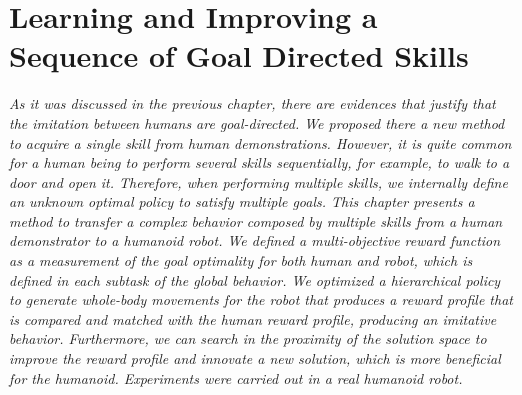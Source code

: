 \chapter{Learning and Improving a Sequence of Goal Directed Skills}\label{ch_multiple_behaviors}
\textit{As it was discussed in the previous chapter, there are evidences that justify that the imitation between humans are goal-directed. We proposed there a new method to acquire a single skill from human demonstrations. However, it is quite common for a human being to perform several skills sequentially, for example, to walk to a door and open it. Therefore, when performing multiple skills, we internally define an unknown optimal policy to satisfy multiple goals. This chapter presents a method to transfer a complex behavior composed by multiple skills  from a human demonstrator to a humanoid robot. We defined a multi-objective reward function as a measurement of the goal optimality for both human and robot, which is defined in each subtask of the global behavior. We optimized a hierarchical policy to generate whole-body movements for the robot that produces a reward profile that is compared and matched with the human reward profile, producing an imitative behavior. Furthermore, we can search in the proximity of the solution space to improve the reward profile and innovate a new solution, which is more beneficial for the humanoid. Experiments were carried out in a real  humanoid robot.}
\newpage












